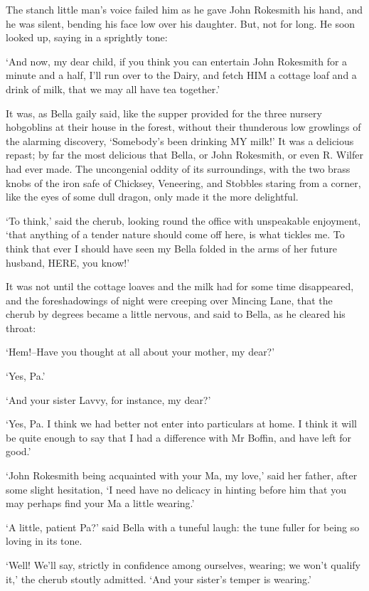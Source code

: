 The stanch little man’s voice failed him as he gave John Rokesmith his
hand, and he was silent, bending his face low over his daughter. But,
not for long. He soon looked up, saying in a sprightly tone:

‘And now, my dear child, if you think you can entertain John Rokesmith
for a minute and a half, I’ll run over to the Dairy, and fetch HIM a
cottage loaf and a drink of milk, that we may all have tea together.’

It was, as Bella gaily said, like the supper provided for the three
nursery hobgoblins at their house in the forest, without their
thunderous low growlings of the alarming discovery, ‘Somebody’s been
drinking MY milk!’ It was a delicious repast; by far the most delicious
that Bella, or John Rokesmith, or even R. Wilfer had ever made. The
uncongenial oddity of its surroundings, with the two brass knobs of the
iron safe of Chicksey, Veneering, and Stobbles staring from a corner,
like the eyes of some dull dragon, only made it the more delightful.

‘To think,’ said the cherub, looking round the office with unspeakable
enjoyment, ‘that anything of a tender nature should come off here, is
what tickles me. To think that ever I should have seen my Bella folded
in the arms of her future husband, HERE, you know!’

It was not until the cottage loaves and the milk had for some time
disappeared, and the foreshadowings of night were creeping over Mincing
Lane, that the cherub by degrees became a little nervous, and said to
Bella, as he cleared his throat:

‘Hem!--Have you thought at all about your mother, my dear?’

‘Yes, Pa.’

‘And your sister Lavvy, for instance, my dear?’

‘Yes, Pa. I think we had better not enter into particulars at home. I
think it will be quite enough to say that I had a difference with Mr
Boffin, and have left for good.’

‘John Rokesmith being acquainted with your Ma, my love,’ said her
father, after some slight hesitation, ‘I need have no delicacy in
hinting before him that you may perhaps find your Ma a little wearing.’

‘A little, patient Pa?’ said Bella with a tuneful laugh: the tune fuller
for being so loving in its tone.

‘Well! We’ll say, strictly in confidence among ourselves, wearing;
we won’t qualify it,’ the cherub stoutly admitted. ‘And your sister’s
temper is wearing.’

